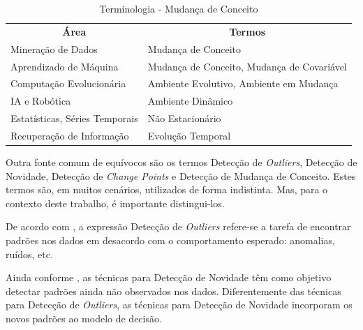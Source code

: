 \documentclass[qual, classic, a4paper]{ufbathesis}
\begin{document}
\begin{center} 
\begin{table}[H]
\label{tbl:taxonomy}
\begin{tabularx}{\textwidth}{|l|X|}
\cline{1-2}
\multicolumn{1}{|c|}{\textbf{Área}} & \multicolumn{1}{c|}{\textbf{Termos}}       \\ \cline{1-2}
Mineração de Dados                  & Mudança de Conceito                        \\ \cline{1-2}
Aprendizado de Máquina              & Mudança de Conceito, Mudança de Covariável \\ \cline{1-2}
Computação Evolucionária            & Ambiente Evolutivo, Ambiente em Mudança    \\ \cline{1-2}
IA e Robótica                       & Ambiente Dinâmico                          \\ \cline{1-2}
Estatísticas, Séries Temporais      & Não Estacionário                           \\ \cline{1-2}
Recuperação de Informação           & Evolução Temporal                          \\ \cline{1-2}
\end{tabularx}
\caption{Terminologia - Mudança de Conceito \cite{Zliobaite:2010}}
\end{table}
\end{center}

Outra fonte comum de equívocos são os termos Detecção de \textit{Outliers}, Detecção de Novidade, Detecção de \textit{Change Points} e Detecção de Mudança de Conceito.
Estes termos são, em muitos cenários, utilizados de forma indistinta.
Mas, para o contexto deste trabalho, é importante distingui-los.

De acordo com \cite{Chandola:2009:ADS:1541880.1541882}, a expressão Detecção de \textit{Outliers} refere-se a tarefa de encontrar padrões nos dados em desacordo com o comportamento esperado: anomalias, ruídos, etc.

Ainda conforme \cite{Chandola:2009:ADS:1541880.1541882}, as técnicas para Detecção de Novidade têm como objetivo detectar padrões ainda não observados nos dados.
Diferentemente das técnicas para Detecção de \textit{Outliers}, as técnicas para Detecção de Novidade incorporam os novos padrões ao modelo de decisão.

\end{document}
